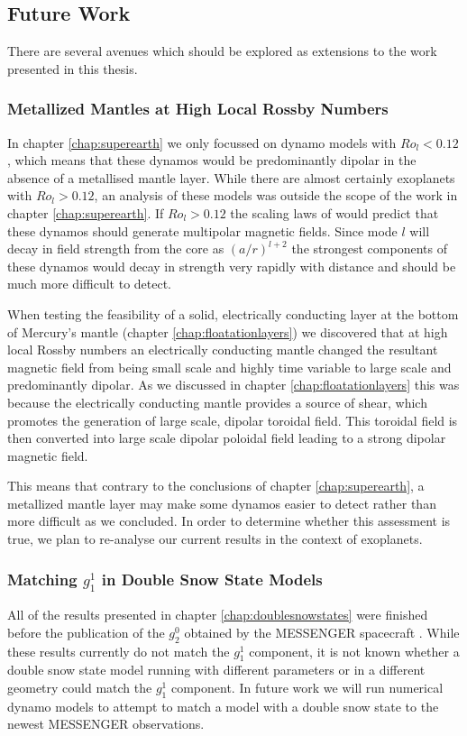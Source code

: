 \subsection{Future Work}
There are several avenues which should be explored as extensions to the work presented in this thesis.

\subsubsection{Metallized Mantles at High Local Rossby Numbers}
In chapter \ref{chap:superearth} we only focussed on dynamo models with $Ro_l<0.12$, which means that these dynamos would be predominantly dipolar in the absence of a metallised mantle layer. While there are almost certainly exoplanets with $Ro_l>0.12$, an analysis of these models was outside the scope of the work in chapter \ref{chap:superearth}. If $Ro_l>0.12$ the scaling laws of \citet{christensen06scaling} would predict that these dynamos should generate multipolar magnetic fields. Since mode $l$ will decay in field strength from the core as $\left(a/r\right)^{l+2}$ the strongest components of these dynamos would decay in strength very rapidly with distance and should be much more difficult to detect. 

When testing the feasibility of a solid, electrically conducting layer at the bottom of Mercury's mantle (chapter \ref{chap:floatationlayers}) we discovered that at high local Rossby numbers an electrically conducting mantle changed the resultant magnetic field from being small scale and highly time variable to large scale and predominantly dipolar. As we discussed in chapter \ref{chap:floatationlayers} this was because the electrically conducting mantle provides a source of shear, which promotes the generation of large scale, dipolar toroidal field. This toroidal field is then converted into large scale dipolar poloidal field leading to a strong dipolar magnetic field. 

This means that contrary to the conclusions of chapter \ref{chap:superearth}, a metallized mantle layer may make some dynamos easier to detect rather than more difficult as we concluded. In order to determine whether this assessment is true, we plan to re-analyse our current results in the context of exoplanets.

\subsubsection{Matching $g_1^1$ in Double Snow State Models}
All of the results presented in chapter \ref{chap:doublesnowstates} were finished before the publication of the $g_2^0$ obtained by the MESSENGER spacecraft \citep{anderson2012}. While these results currently do not match the $g_1^1$ component, it is not known whether a double snow state model running with different parameters or in a different geometry could match the $g_1^1$ component. In future work we will run numerical dynamo models to attempt to match a model with a double snow state to the newest MESSENGER observations.